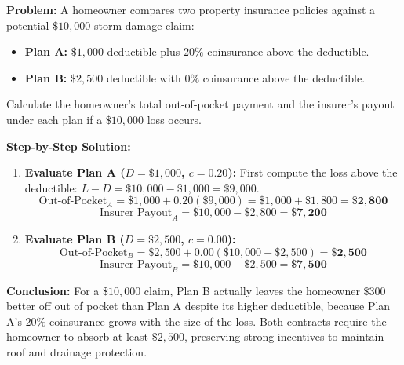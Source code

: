 \documentclass[11pt,letterpaper]{article}
\begin{document}
\begin{tcolorbox}[colback=CourseBlue!5!white,colframe=CourseBlue!80!black,title=\textbf{Work It Out: Comparing Deductible and Coinsurance Plans}]
\textbf{Problem:} A homeowner compares two property insurance policies against a potential $\$10{,}000$ storm damage claim:
\begin{itemize}
    \item \textbf{Plan A:} $\$1{,}000$ deductible plus $20\%$ coinsurance above the deductible.
    \item \textbf{Plan B:} $\$2{,}500$ deductible with $0\%$ coinsurance above the deductible.
\end{itemize}
Calculate the homeowner's total out-of-pocket payment and the insurer's payout under each plan if a $\$10{,}000$ loss occurs.

\medskip
\noindent\textbf{Step-by-Step Solution:}
\begin{enumerate}
    \item \textbf{Evaluate Plan A ($D = \$1{,}000$, $c = 0.20$):}
    First compute the loss above the deductible: $L - D = \$10{,}000 - \$1{,}000 = \$9{,}000$.
    \[
    \text{Out-of-Pocket}_A = \$1{,}000 + 0.20(\$9{,}000) = \$1{,}000 + \$1{,}800 = \mathbf{\$2{,}800}
    \]
    \[
    \text{Insurer Payout}_A = \$10{,}000 - \$2{,}800 = \mathbf{\$7{,}200}
    \]

    \item \textbf{Evaluate Plan B ($D = \$2{,}500$, $c = 0.00$):}
    \[
    \text{Out-of-Pocket}_B = \$2{,}500 + 0.00(\$10{,}000 - \$2{,}500) = \mathbf{\$2{,}500}
    \]
    \[
    \text{Insurer Payout}_B = \$10{,}000 - \$2{,}500 = \mathbf{\$7{,}500}
    \]
\end{enumerate}
\textbf{Conclusion:} For a $\$10{,}000$ claim, Plan B actually leaves the homeowner $\$300$ better off out of pocket than Plan A despite its higher deductible, because Plan A's $20\%$ coinsurance grows with the size of the loss. Both contracts require the homeowner to absorb at least $\$2{,}500$, preserving strong incentives to maintain roof and drainage protection.
\end{tcolorbox}
\end{document}
